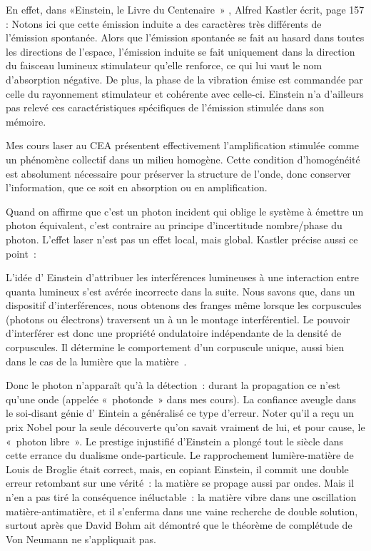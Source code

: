 \documentclass[a4paper,12pt]{article}
\begin{document}
En effet, dans «Einstein, le Livre du Centenaire » \cite{French}, Alfred Kastler écrit, page 157 : Notons ici que cette émission induite a des caractères très différents de l'émission spontanée. Alors que l'émission spontanée se fait au hasard dans toutes les directions de l'espace, l'émission induite se fait uniquement dans la direction du faisceau lumineux stimulateur qu'elle renforce, ce qui lui vaut le nom d'absorption négative. De plus, la phase de la vibration émise est commandée par celle du rayonnement stimulateur et cohérente avec celle-ci. Einstein n'a d'ailleurs pas relevé ces caractéristiques spécifiques de l'émission stimulée dans son mémoire.

Mes cours laser au CEA présentent effectivement l'amplification stimulée comme un phénomène collectif dans un milieu homogène. Cette condition d'homogénéité est absolument nécessaire pour préserver la structure de l'onde, donc conserver l'information, que ce soit en absorption ou en amplification.

Quand on affirme que c'est un photon incident qui oblige le système à émettre un photon équivalent, c'est contraire au principe d'incertitude nombre/phase du photon. L'effet laser n'est pas un effet local, mais global. Kastler précise aussi ce point :

L'idée d' Einstein d'attribuer les interférences lumineuses à une interaction entre quanta lumineux s'est avérée incorrecte dans la suite. Nous savons que, dans un dispositif d'interférences, nous obtenons des franges même lorsque les corpuscules (photons ou électrons) traversent un à un le montage interférentiel. Le pouvoir d'interférer est donc une propriété ondulatoire indépendante de la densité de corpuscules. Il détermine le comportement d'un corpuscule unique, aussi bien dans le cas de la lumière que la matière .

Donc le photon n'apparaît qu'à la détection : durant la propagation ce n'est qu'une onde (appelée « photonde » dans mes cours). La confiance aveugle dans le soi-disant génie d' Eintein a généralisé ce type d'erreur. Noter qu'il a reçu un prix Nobel pour la seule découverte qu'on savait vraiment de lui, et pour cause, le « photon libre ». Le prestige injustifié d'Einstein a plongé tout le siècle dans cette errance du dualisme onde-particule. Le rapprochement lumière-matière de Louis de Broglie était correct, mais, en copiant Einstein, il commit une double erreur retombant sur une vérité : la matière se propage aussi par ondes. Mais il n'en a pas tiré la conséquence inéluctable : la matière vibre dans une oscillation matière-antimatière, et il s'enferma dans une vaine recherche de double solution, surtout après que David Bohm ait démontré que le théorème de complétude de Von Neumann ne s'appliquait pas.
\end{document}
